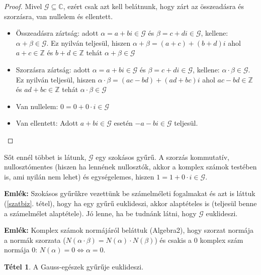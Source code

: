 \documentclass[12pt]{book}
\theoremstyle{plain} %
\theoremstyle{definition} %
\newtheorem{theo/}{Tétel}[section]
\newenvironment{theo}
  {\renewcommand{\qedsymbol}{$\clubsuit$}%
   \pushQED{\qed}\begin{theo/}}
  {\popQED\end{theo/}}
\theoremstyle{remark}
\renewcommand\qedsymbol{$\blacksquare$}
\numberwithin{equation}{section}  %
\def\Z{\mathbb{Z}}
\def\C{\mathbb{C}}
\begin{document}
	\begin{proof}
		Mivel $\mathcal{G}\subseteq \C$, ezért csak azt kell belátnunk, hogy zárt az összeadásra és szorzásra, van nullelem és ellentett.
		\begin{itemize}
			\item{Összeadásra zártság: adott $\alpha=a+bi\in \mathcal{G}$ és $\beta=c+di\in \mathcal{G}$, kellene: $\alpha+\beta\in\mathcal{G}$. Ez nyilván teljesül, hiszen $\alpha+\beta = (a+c) + (b+d)i$ ahol $a+c\in \Z$ és $b+d\in \Z$ tehát $\alpha+\beta\in \mathcal{G}$ }
			\item{Szorzásra zártság: adott $\alpha=a+bi\in \mathcal{G}$ és $\beta=c+di\in \mathcal{G}$, kellene: $\alpha \cdot \beta\in\mathcal{G}$. Ez nyilván teljesül, hiszen $\alpha \cdot \beta = (ac-bd) + (ad+bc)i$ ahol $ac-bd\in \Z$ és $ad+bc\in \Z$ tehát $\alpha \cdot \beta\in \mathcal{G}$ }
			\item{Van nullelem: $0=0+0\cdot i \in \mathcal{G}$}
			\item{Van ellentett: Adott $a+bi\in \mathcal{G}$ esetén $-a-bi\in \mathcal{G}$ teljesül.}
		\end{itemize}
	\end{proof}

	Sőt ennél többet is látunk, $\mathcal{G}$ egy szokásos gyűrű. A szorzás kommutatív, nullosztómentes (hiszen ha lennének nullosztók, akkor a komplex számok testében is, ami nyilán nem lehet) és egységelemes, hiszen $1=1+0\cdot i\in \mathcal{G}$.
	
	\textbf{Emlék:} Szokásos gyűrűkre vezettünk be számelméleti fogalmakat és azt is láttuk (\ref{szatbiz}. tétel), hogy ha egy gyűrű euklideszi, akkor alaptételes is (teljesül benne a számelmélet alaptétele). Jó lenne, ha be tudnánk látni, hogy $\mathcal{G}$ euklideszi.
	
	\textbf{Emlék:} Komplex számok normájáról beláttuk (Algebra2), hogy szorzat normája a normák szorzata ($N(\alpha\cdot \beta) = N(\alpha)\cdot N(\beta)$) és csakis a $0$ komplex szám normája $0$: $N(\alpha) = 0 \Leftrightarrow \alpha = 0$.

	\begin{theo}
		A Gauss-egészek gyűrűje euklideszi.
	\end{theo}
	
\end{document}
